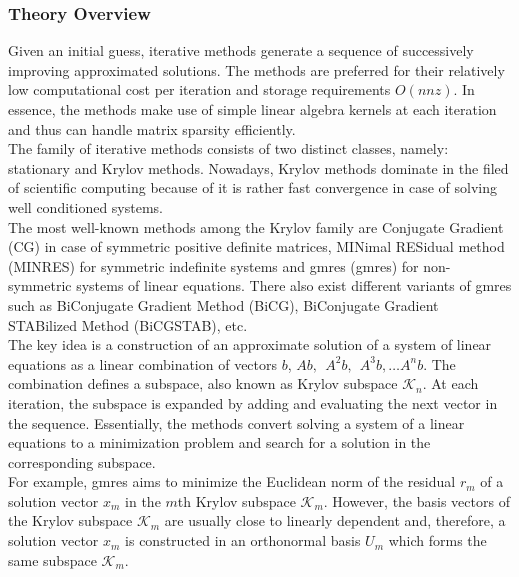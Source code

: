 \subsubsection{Theory Overview}
\label{subseq:iterative-theory}


Given an initial guess, iterative methods generate a sequence of successively improving approximated solutions. The methods are preferred for their relatively low computational cost per iteration and storage requirements $O(nnz)$. In essence, the methods make use of simple linear algebra kernels  at each iteration and thus can handle matrix sparsity efficiently.\\



The family of iterative methods consists of two distinct classes, namely: stationary and Krylov methods. Nowadays, Krylov methods dominate in the filed of scientific computing because of it is rather fast convergence in case of solving well conditioned systems.\\


The most well-known methods among the Krylov family are Conjugate Gradient (CG) in case of symmetric positive definite matrices, MINimal RESidual method (MINRES) for symmetric indefinite systems and \acrlong{gmres} (\acrshort{gmres}) for non-symmetric systems of linear equations. There also exist different variants of \acrshort{gmres} such as BiConjugate Gradient Method (BiCG), BiConjugate Gradient STABilized Method (BiCGSTAB), etc.\\


The key idea is a construction of an approximate solution of a system of linear equations as a linear combination of vectors $b$, $Ab, \:\: A^2b, \:\: A^3b, \dots A^{n}b$. The combination defines a subspace, also known as Krylov subspace $\mathcal{K}_{n}$. At each iteration, the subspace is expanded by adding and evaluating the next vector in the sequence. Essentially, the methods convert solving a system of a linear equations to a minimization problem and search for a solution in the corresponding subspace.\\


For example, \acrshort{gmres} aims to minimize the Euclidean norm of the residual $r_{m}$ of a solution vector $x_{m}$ in the $m$th Krylov subspace $\mathcal{K}_{m}$. However, the basis vectors of the Krylov subspace $\mathcal{K}_{m}$ are usually close to linearly dependent and, therefore, a solution vector $x_{m}$ is constructed in an orthonormal basis $U_{m}$ which forms the same subspace $\mathcal{K}_{m}$.\\


